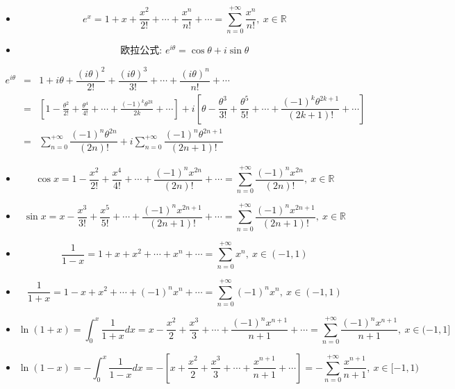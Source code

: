 \begin{theorem}[常用泰勒级数]
	\begin{itemize}
		\item $$e^{x}=1+x+\dfrac{x^2}{2!}+\cdots+\dfrac{x^n}{n!}+\cdots=\sum\limits_{n=0}^{+\infty}\dfrac{x^n}{n!},\ x\in \mathbb{R}$$
		\item $$\text{欧拉公式: }e^{i\theta}=\cos\theta+i\sin\theta$$
	\end{itemize}
	\begin{eqnarray*}
		e^{i\theta} & = & 1+i\theta+\dfrac{(i\theta)^2}{2!}+\dfrac{(i\theta)^3}{3!}+\cdots+\dfrac{(i\theta)^n}{n!}+\cdots\\
		            & = & [1-\frac{\theta^2}{2!}+\frac{\theta^4}{4!}+\cdots+\frac{(-1)^{k}\theta^{2k}}{2k}+\cdots]+i[\theta-\dfrac{\theta^3}{3!}+\dfrac{\theta^5}{5!}+\cdots+\dfrac{(-1)^{k}\theta^{2k+1}}{(2k+1)!}+\cdots]\\
		            & = & \sum\limits_{n=0}^{+\infty}\dfrac{(-1)^{n}\theta^{2n}}{(2n)!}+i\sum\limits_{n=0}^{+\infty}\dfrac{(-1)^{n}\theta^{2n+1}}{(2n+1)!}
	\end{eqnarray*}
	\begin{itemize}
		\item $$\cos x=1-\dfrac{x^2}{2!}+\dfrac{x^4}{4!}+\cdots+\dfrac{(-1)^{n}x^{2n}}{(2n)!}+\cdots=\sum\limits_{n=0}^{+\infty}\dfrac{(-1)^{n}x^{2n}}{(2n)!},\ x\in\mathbb{R}$$
		\item $$\sin x=x-\dfrac{x^3}{3!}+\dfrac{x^5}{5!}+\cdots+\dfrac{(-1)^{n}x^{2n+1}}{(2n+1)!}+\cdots=\sum\limits_{n=0}^{+\infty}\dfrac{(-1)^{n}x^{2n+1}}{(2n+1)!},\ x\in\mathbb{R}$$
		\item $$\dfrac{1}{1-x}=1+x+x^2+\cdots+x^n+\cdots=\sum\limits_{n=0}^{+\infty}x^n,\ x\in(-1,1)$$
		\item $$\dfrac{1}{1+x}=1-x+x^2+\cdots+(-1)^nx^n+\cdots=\sum\limits_{n=0}^{+\infty}(-1)^nx^n,\ x\in(-1,1)$$
		\item $$\ln(1+x)=\int_{0}^{x}\dfrac{1}{1+x}dx=x-\dfrac{x^2}{2}+\dfrac{x^3}{3}+\cdots+\dfrac{(-1)^{n}x^{n+1}}{n+1}+\cdots=\sum\limits_{n=0}^{+\infty}\dfrac{(-1)^{n}x^{n+1}}{n+1},\ x\in(-1,1]$$
		\item 
		$$\ln(1-x)=-\int_{0}^{x}\dfrac{1}{1-x}dx=-[x+\dfrac{x^2}{2}+\dfrac{x^3}{3}+\cdots+\dfrac{x^{n+1}}{n+1}+\cdots]=-\sum\limits_{n=0}^{+\infty}\dfrac{x^{n+1}}{n+1},\ x\in[-1,1)$$
	\end{itemize}
\end{theorem}
